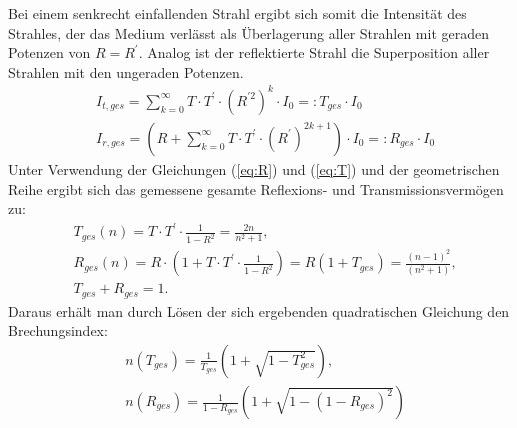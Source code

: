 	Bei einem senkrecht einfallenden Strahl ergibt sich somit die Intensität des Strahles, der das Medium verlässt als Überlagerung aller Strahlen mit geraden Potenzen von $R = R^\prime$. Analog ist der reflektierte Strahl die Superposition aller Strahlen mit den ungeraden Potenzen.
	\begin{align}
		&I_{t,ges} = \sum_{k = 0}^{\infty} T\cdot T^\prime \cdot (R^{\prime 2})^k \cdot I_0 =: T_{ges}\cdot I_0\\
		&I_{r,ges} = \left(R + \sum_{k = 0}^{\infty} T\cdot T^\prime \cdot (R^\prime)^{2k+1}\right) \cdot I_0 =: R_{ges}\cdot I_0
	\end{align}
	Unter Verwendung der Gleichungen (\ref{eq:R}) und (\ref{eq:T}) und der geometrischen Reihe ergibt sich das gemessene gesamte Reflexions- und Transmissionsvermögen zu:
	\begin{align}
			&T_{ges}(n) = T\cdot T^\prime \cdot \frac{1}{1 - R^2} = \frac{2n}{n^2 + 1},\\
			&R_{ges}(n) = R\cdot \left(1 + T\cdot T^\prime \cdot \frac{1}{1 - R^2}\right) = R (1 + T_{ges}) = \frac{(n-1)^2}{(n^2+1)},\\
			&T_{ges} + R_{ges} = 1.
	\end{align}
	Daraus erhält man durch Lösen der sich ergebenden quadratischen Gleichung den Brechungsindex:
	\begin{align}
		&n(T_{ges}) = \frac{1}{T_{ges}}\left(1 + \sqrt{1 - T_{ges}^2}\right), \label{eq:n_T}\\
		&n(R_{ges}) = \frac{1}{1 - R_{ges}}\left(1 + \sqrt{1 - (1 - R_{ges})^2}\right) \label{eq:n_R}
	\end{align}
	